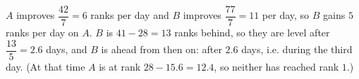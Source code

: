 $A$ improves $\dfrac{42}{7}=6$ ranks per day and $B$ improves $\dfrac{77}{7}=11$ per day, so $B$ gains $5$ ranks per day on $A$. $B$ is $41-28=13$ ranks behind, so they are level after $\dfrac{13}{5}=2.6$ days, and $B$ is ahead from then on: after $\boxed{2.6}$ days, i.e. during the third day. (At that time $A$ is at rank $28-15.6=12.4$, so neither has reached rank $1$.)
